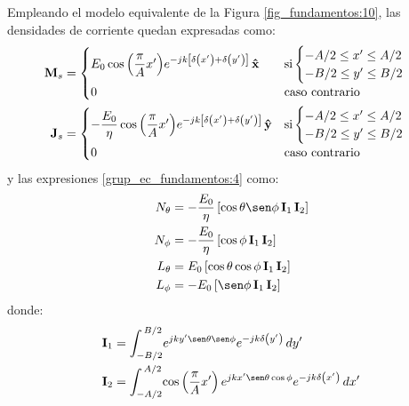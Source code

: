 Empleando el modelo equivalente de la Figura \ref{fig_fundamentos:10}, las densidades de corriente quedan expresadas como:
\begin{align}
\mathbf{M}_s &=
\begin{cases}
\makebox[0pt][l]{$E_0\cos\left(\dfrac{\pi}{A}x'\right)\!e^{-jk\left[\delta\left(x'\right) + \delta\left(y'\right)\right]}\,\versor{x}$}\hphantom{-\dfrac{E_0}{\eta}\cos\left(\dfrac{\pi}{A}x'\right)\!e^{-jk\left[\delta\left(x'\right) + \delta\left(y'\right)\right]}\,\versor{y}} &\text{si}
\begin{cases} 
-A/2 \leq x' \leq A/2\\
-B/2 \leq y' \leq B/2
\end{cases}\\
0 & \text{caso contrario}
\end{cases}
\label{ec_apB:133}\\
\mathbf{J}_s &= 
\begin{cases} 
-\dfrac{E_0}{\eta}\cos\left(\dfrac{\pi}{A}x'\right)\!e^{-jk\left[\delta\left(x'\right) + \delta\left(y'\right)\right]}\,\versor{y} &\text{si}
\begin{cases} 
-A/2 \leq x' \leq A/2\\
-B/2 \leq y' \leq B/2
\end{cases}\\
0  &\text{caso contrario}
\end{cases}
\label{ec_apB:134}
\end{align}
y las expresiones \eqref{grup_ec_fundamentos:4} como:
\begin{subequations}
\label{grup_ec_apB:24}
\begin{align}
N_{\theta} &= - \dfrac{E_0}{\eta}\left[\cos\theta\sen\phi\,\mathbf{I}_1\,\mathbf{I}_2\right]
\label{ec_apB:135}\\
N_{\phi} &= - \dfrac{E_0}{\eta}\left[\cos\phi\,\mathbf{I}_1\,\mathbf{I}_2\right]
\label{ec_apB:136}\\
L_{\theta} &= E_0\left[\cos\theta\cos\phi\,\mathbf{I}_1\,\mathbf{I}_2\right]
\label{ec_apB:137}\\
L_{\phi} &= - E_0\left[\sen\phi\,\mathbf{I}_1\,\mathbf{I}_2\right]
\label{ec_apB:138}
\end{align}
\end{subequations}
donde:
\begin{align}
\mathbf{I}_1 &= \int_{-B/2}^{\,B/2}\!e^{jky'\sen\theta\sen\phi}e^{-jk\delta\left(y'\right)}\,dy'
\label{ec_apB:139}\\
\mathbf{I}_2 &= \int_{-A/2}^{\,A/2}\!\cos\left(\dfrac{\pi}{A}x'\right)e^{jkx'\sen\theta\cos\phi}e^{-jk\delta\left(x'\right)}\,dx'
\label{ec_apB:140}
\end{align}
